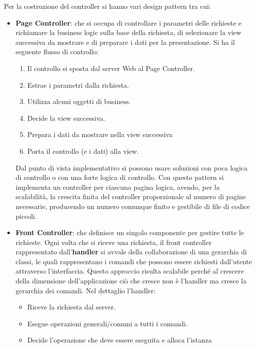 Per la costruzione del controller si hanno vari design pattern tra cui:
\begin{itemize}
    \item \textbf{Page Controller}: che si occupa di controllare i parametri
          delle richieste e richiamare la business logic sulla base della richiesta, di
          selezionare la view successiva da mostrare e di preparare i dati per la
          presentazione. Si ha il seguente flusso di controllo:
          \begin{enumerate}
              \item Il controllo si sposta dal server Web al Page Controller.
              \item Estrae i parametri dalla richiesta.
              \item Utilizza alcuni oggetti di business.
              \item Decide la view successiva.
              \item Prepara i dati da mostrare nella view successiva
              \item Porta il controllo (e i dati) alla view.
          \end{enumerate}
          Dal punto di vista implementativo si possono usare soluzioni con poca
          logica di controllo o con una forte logica di controllo. Con questo pattern
          si implementa un controller per ciascuna pagina logica, avendo, per la
          scalabilità, la crescita finita del controller proporzionale al numero
          di pagine necessarie, producendo un numero comunque finito e gestibile
          di file di codice piccoli.
    \item \textbf{Front Controller}: che definisce un singolo componente per gestire
          tutte le richieste. Ogni volta che si riceve una richiesta, il front controller
          rappresentato dall'\textbf{handler} si avvale della collaborazione di una gerarchia
          di classi, le quali rappresentano i comandi che possono essere richiesti dall'utente
          attraverso l'interfaccia. Questo approccio risulta scalabile perché al crescere della
          dimensione dell'applicazione ciò che cresce non è l'handler ma cresce la gerarchia
          dei comandi. Nel dettaglio l'handler:
          \begin{itemize}
              \item Riceve la richiesta dal server.
              \item Esegue operazioni generali/comuni a tutti i comandi.
              \item Decide l'operazione che deve essere eseguita e alloca l'istanza

\end{itemize}
\end{itemize}
